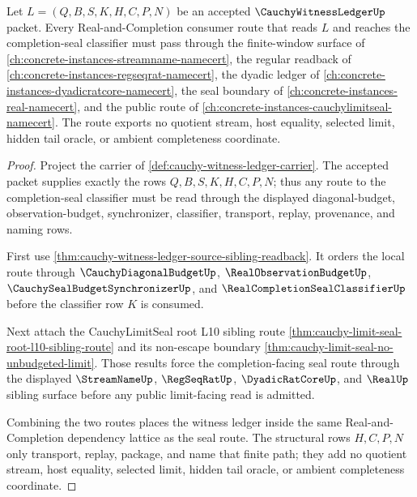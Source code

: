 \begin{theorem}
\label{thm:cauchy-witness-ledger-real-completion-sibling-route}
Let $L=(Q,B,S,K,H,C,P,N)$ be an accepted $\CauchyWitnessLedgerUp$
packet. Every Real-and-Completion consumer route that reads $L$ and reaches
the completion-seal classifier must pass through the finite-window surface of
\autoref{ch:concrete-instances-streamname-namecert}, the regular readback of
\autoref{ch:concrete-instances-regseqrat-namecert}, the dyadic ledger of
\autoref{ch:concrete-instances-dyadicratcore-namecert}, the seal boundary of
\autoref{ch:concrete-instances-real-namecert}, and the public route of
\autoref{ch:concrete-instances-cauchylimitseal-namecert}. The route exports no
quotient stream, host equality, selected limit, hidden tail oracle, or ambient
completeness coordinate.
\end{theorem}
\begin{proof}
Project the carrier of \autoref{def:cauchy-witness-ledger-carrier}. The
accepted packet supplies exactly the rows $Q,B,S,K,H,C,P,N$; thus any route to
the completion-seal classifier must be read through the displayed
diagonal-budget, observation-budget, synchronizer, classifier, transport,
replay, provenance, and naming rows.

First use \autoref{thm:cauchy-witness-ledger-source-sibling-readback}. It
orders the local route through $\CauchyDiagonalBudgetUp$,
$\RealObservationBudgetUp$, $\CauchySealBudgetSynchronizerUp$, and
$\RealCompletionSealClassifierUp$ before the classifier row $K$ is consumed.

Next attach the CauchyLimitSeal root L10 sibling route
\autoref{thm:cauchy-limit-seal-root-l10-sibling-route} and its non-escape
boundary \autoref{thm:cauchy-limit-seal-no-unbudgeted-limit}. Those results
force the completion-facing seal route through the displayed
$\StreamNameUp$, $\RegSeqRatUp$, $\DyadicRatCoreUp$, and $\RealUp$ sibling
surface before any public limit-facing read is admitted.

Combining the two routes places the witness ledger inside the same
Real-and-Completion dependency lattice as the seal route. The structural rows
$H,C,P,N$ only transport, replay, package, and name that finite path; they add
no quotient stream, host equality, selected limit, hidden tail oracle, or
ambient completeness coordinate.
\end{proof}
